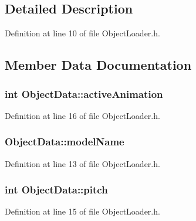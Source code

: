 \subsection{Detailed Description}


Definition at line 10 of file Object\+Loader.\+h.



\subsection{Member Data Documentation}
\subsubsection[{\texorpdfstring{active\+Animation}{activeAnimation}}]{\setlength{\rightskip}{0pt plus 5cm}int Object\+Data\+::active\+Animation}\hypertarget{struct_object_data_a501c56b0aecd2f1a0fffc319a940af07}{}\label{struct_object_data_a501c56b0aecd2f1a0fffc319a940af07}


Definition at line 16 of file Object\+Loader.\+h.

\subsubsection[{\texorpdfstring{model\+Name}{modelName}}]{ Object\+Data\+::model\+Name}\hypertarget{struct_object_data_a50cebd94c06bce02597ab7524dc10968}{}\label{struct_object_data_a50cebd94c06bce02597ab7524dc10968}


Definition at line 13 of file Object\+Loader.\+h.

\subsubsection[{\texorpdfstring{pitch}{pitch}}]{\setlength{\rightskip}{0pt plus 5cm}int Object\+Data\+::pitch}\hypertarget{struct_object_data_a9df49c33adc12c93b5da48f0a517ba34}{}\label{struct_object_data_a9df49c33adc12c93b5da48f0a517ba34}


Definition at line 15 of file Object\+Loader.\+h.

